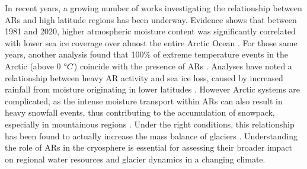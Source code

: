 \documentclass[12pts,draft]{AR_analysis_}
\begin{document}
In recent years, a growing number of works 
investigating the relationship between ARs and 
high latitude regions has been underway. Evidence shows that between
1981 and 2020, higher atmospheric moisture content was significantly correlated
with lower sea ice coverage over almost the entire Arctic Ocean
\cite{ARs_lead_to_sea_ice_loss}. For those same years, another analysis
found that 100\% of extreme temperature events in the Arctic (above 0
$\degree C$) coincide with the presence of ARs \cite{Ma2023}. Analyses have noted
a relationship between heavy AR activity and sea ice loss, caused by
increased rainfall from moisture originating in lower latitudes
\cite{Zhang2023, maclennan_contribution_2022}. However Arctic systems
are complicated, as the intense moisture transport within ARs can also
result in heavy snowfall events, thus contributing to the accumulation
of snowpack, especially in mountainous regions \cite{Saavedra2020,
Guan2010}. Under the right conditions, this relationship has been found
to actually increase the mass balance of glaciers \cite{Little2019}.
Understanding the role of ARs in the cryosphere is essential for
assessing their broader impact on regional water resources and glacier
dynamics in a changing climate. 
\end{document}
